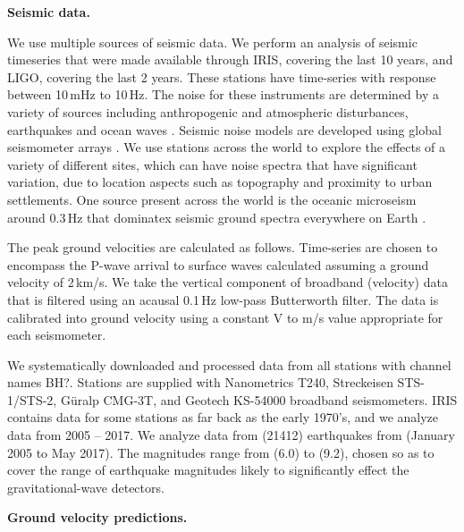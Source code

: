 \documentclass[preprint, aps, showpacs]{revtex4-1}
\newcommand{\rednote}[1]{{\color{red} (#1)}}
\begin{document}
\textbf{Seismic data.}

We use multiple sources of seismic data.
We perform an analysis of seismic timeseries that were made available through IRIS, covering the last 10 years, and LIGO, covering the last 2 years. 
These stations have time-series with response between 10\,mHz to 10\,Hz.
The noise for these instruments are determined by a variety of sources including anthropogenic and atmospheric disturbances, earthquakes and ocean waves \cite{BCB2006}. 
Seismic noise models are developed using global seismometer arrays  \cite{Pet1993,BDE2004,McEA2009}.
We use stations across the world to explore the effects of a variety of different sites, which can have noise spectra that have significant variation, due to location aspects such as topography and proximity to urban settlements.
One source present across the world is the oceanic microseism around 0.3\,Hz that dominatex seismic ground spectra everywhere on Earth \cite{HMS1963,ToLa1968,Ces1994,FKK1998}. 

The peak ground velocities are calculated as follows.
Time-series are chosen to encompass the P-wave arrival to surface waves calculated assuming a ground velocity of 2\,km/s.
We take the vertical component of broadband (velocity) data that is filtered using an acausal 0.1\,Hz low-pass Butterworth filter.
The data is calibrated into ground velocity using a constant V to m/s value appropriate for each seismometer.

We systematically downloaded and processed data from all stations with channel names BH?. Stations are supplied with Nanometrics T240, Streckeisen STS-1/STS-2, G\"uralp CMG-3T, and Geotech KS-54000 broadband seismometers. 
IRIS contains data for some stations as far back as the early 1970's, and we analyze data from 2005 -- 2017.
We analyze data from \rednote{21412} earthquakes from \rednote{January 2005 to May 2017}.
The magnitudes range from \rednote{6.0} to \rednote{9.2}, chosen so as to cover the range of earthquake magnitudes likely to significantly effect the gravitational-wave detectors.

\textbf{Ground velocity predictions.}
\end{document}
